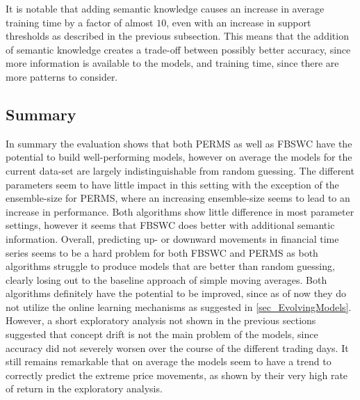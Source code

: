 It is notable that adding semantic knowledge causes an increase in average training time by a factor of almost $10$, even with an increase in support thresholds as described in the previous subsection. This means that the addition of semantic knowledge creates a trade-off between possibly better accuracy, since more information is available to the models, and training time, since there are more patterns to consider.

\subsection{Summary}
In summary the evaluation shows that both PERMS as well as FBSWC have the potential to build well-performing models, however on average the models for the current data-set are largely indistinguishable from random guessing. The different parameters seem to have little impact in this setting with the exception of the ensemble-size for PERMS, where an increasing ensemble-size seems to lead to an increase in performance. Both algorithms show little difference in most parameter settings, however it seems that FBSWC does better with additional semantic information. Overall, predicting up- or downward movements in financial time series seems to be a hard problem for both FBSWC and PERMS as both algorithms struggle to produce models that are better than random guessing, clearly losing out to the baseline approach of simple moving averages. Both algorithms definitely have the potential to be improved, since as of now they do not utilize the online learning mechanisms as suggested in \ref{sec_EvolvingModels}. However, a short exploratory analysis not shown in the previous sections suggested that concept drift is not the main problem of the models, since accuracy did not severely worsen over the course of the different trading days. It still remains remarkable that on average the models seem to have a trend to correctly predict the extreme price movements, as shown by their very high rate of return in the exploratory analysis.